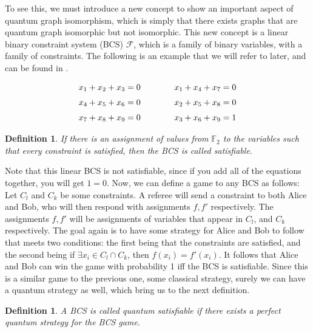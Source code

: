 \documentclass[12pt]{article}
\newtheorem{defn}[thm]{Definition}
\begin{document}
To see this, we must introduce a new concept to show an important
aspect of quantum graph isomorphism, which is simply that there exists
graphs that are quantum graph isomorphic but not isomorphic. This new
concept is a linear binary constraint system (BCS) $\mathcal{F}$,
which is a family of binary variables, with a family of
constraints. The following is an example that we will refer to later,
and can be found in \cite{cm2014}.

\begin{equation*}
\label{bcs}
\openup\jot %
\begin{aligned}[t]
x_1 + x_2 + x_3 &= 0 \\
x_4 + x_5 + x_6 &= 0 \\
x_7 + x_8 + x_9 &= 0
\end{aligned}
\qquad\qquad %
\begin{aligned}[t]
x_1 + x_4 + x_7 &= 0 \\
x_2 + x_5 + x_8 &= 0 \\
x_3 + x_6 + x_9 &= 1
\end{aligned}
\end{equation*}

\begin{defn}
  If there is an assignment of values from $\mathbb{F}_2$ to the
  variables such that every constraint is satisfied, then the BCS is
  called satisfiable.
\end{defn}

Note that this linear BCS is not satisfiable, since if you add all of
the equations together, you will get $1=0$. Now, we can define a game
to any BCS as follows: Let $C_l$ and $C_k$ be some constraints. A
referee will send a constraint to both Alice and Bob, who will then
respond with assignments $f, f'$ respectively. The assignments $f, f'$
will be assignments of variables that appear in $C_l$, and $C_k$
respectively. The goal again is to have some strategy for Alice and
Bob to follow that meets two conditions: the first being that the
constraints are satisfied, and the second being if $\exists x_i \in
C_l \cap C_k$, then $f(x_i) = f'(x_i)$. It follows that Alice and Bob
can win the game with probability 1 iff the BCS is satisfiable. Since
this is a similar game to the previous one, some classical strategy,
surely we can have a quantum strategy as well, which bring us to the
next definition.

\begin{defn}
A BCS is called quantum satisfiable if there exists a perfect quantum
strategy for the BCS game.
\end{defn}
\end{document}
